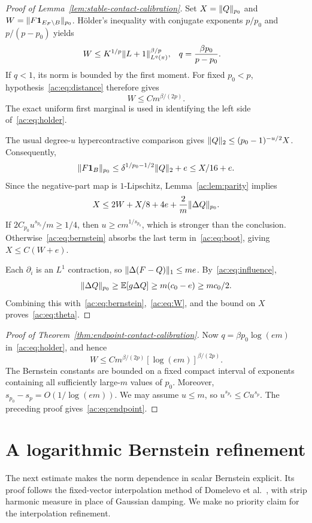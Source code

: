 \begin{proof}[Proof of Lemma~\ref{lem:stable-contact-calibration}]
Set $X=\lVert Q\rVert_{p_0}$ and $W=\lVert F\mathbf 1_{E_F\setminus B}\rVert_{p_0}$.
H\"older's inequality with conjugate exponents $p/p_0$ and $p/(p-p_0)$ yields
\begin{align}
 W
 &\le K^{1/p}\lVert L+1\rVert_{L^q(\pi)}^{\beta/p},
 &q&=\frac{\beta p_0}{p-p_0}.\label{ac:eq:holder}
\end{align}
If $q<1$, its norm is bounded by the first moment. For fixed $p_0<p$, hypothesis~\eqref{ac:eq:distance} therefore gives
\begin{equation}\label{ac:eq:W}
 W\le C m^{\beta/(2p)}.
\end{equation}
The exact uniform first marginal is used in identifying the left side of~\eqref{ac:eq:holder}.

The usual degree-$u$ hypercontractive comparison gives
$\lVert Q\rVert_{2}\le(p_0-1)^{-u/2}X$. Consequently,
\[
 \lVert F\mathbf 1_B\rVert_{p_0}
 \le\delta^{1/p_0-1/2}\lVert Q\rVert_{2}+e
 \le X/16+e.
\]
Since the negative-part map is $1$-Lipschitz, Lemma~\ref{ac:lem:parity} implies
\begin{equation}\label{ac:eq:boot}
 X\le2W+X/8+4e+\frac2m\lVert \Delta Q\rVert_{p_0}.
\end{equation}
If $2C_{p_0}u^{s_{p_0}}/m\ge1/4$, then $u\ge c m^{1/s_{p_0}}$, which is stronger than the conclusion. Otherwise~\eqref{ac:eq:bernstein} absorbs the last term in~\eqref{ac:eq:boot}, giving $X\le C(W+e)$.

Each $\partial_i$ is an $L^1$ contraction, so
$\lVert \Delta(F-Q)\rVert_{1}\le me$. By~\eqref{ac:eq:influence},
\[
 \lVert \Delta Q\rVert_{p_0}\ge\mathbb E[g\Delta Q]\ge m(c_0-e)\ge mc_0/2.
\]
Combining this with~\eqref{ac:eq:bernstein},~\eqref{ac:eq:W}, and the bound on $X$ proves~\eqref{ac:eq:theta}.
\end{proof}

\begin{proof}[Proof of Theorem~\ref{thm:endpoint-contact-calibration}]
Now $q=\beta p_0\log(em)$ in~\eqref{ac:eq:holder}, and hence
\[
 W\le C m^{\beta/(2p)}[\log(em)]^{\beta/(2p)}.
\]
The Bernstein constants are bounded on a fixed compact interval of exponents containing all sufficiently large-$m$ values of $p_0$. Moreover,
$s_{p_0}-s_p=O(1/\log(em))$. We may assume $u\le m$, so
$u^{s_{p_0}}\le C u^{s_p}$. The preceding proof gives~\eqref{ac:eq:endpoint}.
\end{proof}


\section{A logarithmic Bernstein refinement}\label{ac:sec:log}
The next estimate makes the norm dependence in scalar Bernstein explicit. Its proof follows the fixed-vector interpolation method of Domelevo et al.\ \cite{Domelevo}, with strip harmonic measure in place of Gaussian damping. We make no priority claim for the interpolation refinement.

